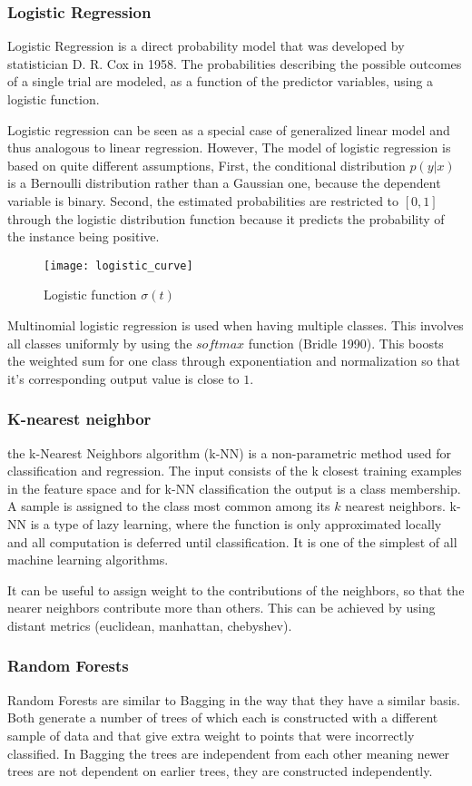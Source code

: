 \subsubsection{Logistic Regression}
Logistic Regression is a direct probability model that was developed by statistician D. R. Cox in 1958. The probabilities describing the possible outcomes of a single trial are modeled, as a function of the predictor variables, using a logistic function. 

Logistic regression can be seen as a special case of generalized linear model and thus analogous to linear regression. However, The model of logistic regression is based on quite different assumptions, First, the conditional distribution $p(y|x)$ is a Bernoulli distribution rather than a Gaussian one, because the dependent variable is binary. Second, the estimated probabilities are restricted to $[0,1]$ through the logistic distribution function because it predicts the probability of the instance being positive.
\begin{figure}[h!]
	\centering
	\texttt{[image: logistic\_curve]}
	\caption{Logistic function $\sigma(t)$}
	\label{fig:log_curve}
\end{figure}

Multinomial logistic regression is used when having multiple classes. This involves all classes uniformly by using the $softmax$ function (Bridle 1990). This boosts the weighted sum for one class through exponentiation and normalization so that it's corresponding output value is close to $1$.
\subsubsection{K-nearest neighbor}
 the k-Nearest Neighbors algorithm (k-NN) is a non-parametric method used for classification and regression. The input consists of the k closest training examples in the feature space and for k-NN classification the output is a class membership. A sample is assigned to the class most common among its $k$ nearest neighbors. k-NN is a type of lazy learning, where the function is only approximated locally and all computation is deferred until classification. It is one of the simplest of all machine learning algorithms. 
 
 It can be useful to assign weight to the contributions of the neighbors, so that the nearer neighbors contribute more than others. This can be achieved by using distant metrics (euclidean, manhattan, chebyshev).
\subsubsection{Random Forests}
Random Forests are similar to Bagging in the way that they have a similar basis. Both generate a number of trees of which each is constructed with a different sample of data and that give extra weight to points that were incorrectly classified. In Bagging the trees are independent from each other meaning newer trees are not dependent on earlier trees, they are constructed independently.

